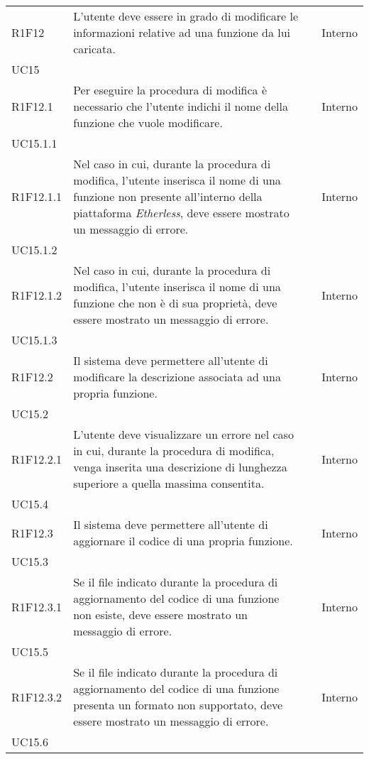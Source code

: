 \begin{longtable}{ 
		>{\centering}p{} 
		>{}p{} 
		>{\centering}p{}
		>{\centering}p{} }
	R1F12 & L'utente deve essere in grado di modificare le informazioni relative 
		ad una funzione da lui caricata. 											& \ob & Interno \\ UC15 \tabularnewline
	R1F12.1 & Per eseguire la procedura di modifica è necessario che l'utente 
		indichi il nome della funzione che vuole modificare. 						& \ob & Interno \\ UC15.1.1 \tabularnewline
	R1F12.1.1 & Nel caso in cui, durante la procedura di modifica, l'utente 
		inserisca il nome di una funzione non presente all'interno della piattaforma
		\textit{Etherless}, deve essere mostrato un messaggio di errore.				& \ob & Interno \\ UC15.1.2 \tabularnewline
	R1F12.1.2 & Nel caso in cui, durante la procedura di modifica, l'utente 
		inserisca il nome di una funzione che non è di sua proprietà, deve essere 
		mostrato un messaggio di errore.												& \ob & Interno \\ UC15.1.3 \tabularnewline
	R1F12.2 & Il sistema deve permettere all'utente di modificare la descrizione 
		associata ad una propria funzione. 											& \ob & Interno \\ UC15.2 \tabularnewline
	R1F12.2.1 & L'utente deve visualizzare un errore nel caso in cui, durante 
		la procedura di modifica, venga inserita una descrizione di lunghezza
		superiore a quella massima consentita. 										& \ob & Interno \\ UC15.4 \tabularnewline
	R1F12.3 & Il sistema deve permettere all'utente di aggiornare il codice di 
		una propria funzione. 														& \ob & Interno \\ UC15.3 \tabularnewline	
	R1F12.3.1 & Se il file indicato durante la procedura di aggiornamento del 
		codice di una funzione non esiste, deve essere mostrato un messaggio di 
		errore.																		& \ob & Interno \\ UC15.5 \tabularnewline
	R1F12.3.2 & Se il file indicato durante la procedura di aggiornamento del 
		codice di una funzione presenta un formato non supportato, deve 
		essere mostrato un messaggio di errore.										& \ob & Interno \\ UC15.6 \tabularnewline  
		

\end{longtable}
